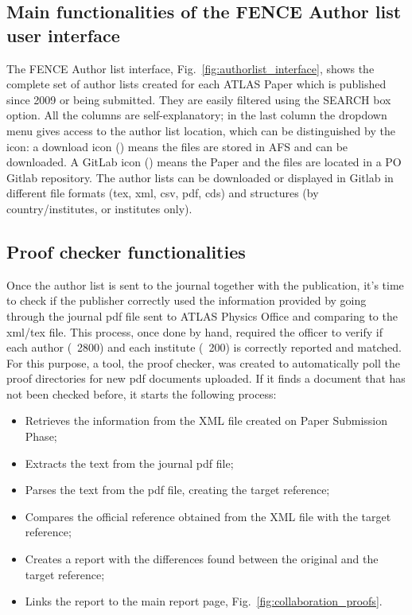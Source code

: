 \subsection{Main functionalities of the FENCE Author list user interface}
\label{sec:Main_functionalities_of_the_FENCE_Author_list_user_interface}

The FENCE Author list interface, Fig.~\ref{fig:authorlist_interface}, shows the complete set of author lists created for each ATLAS Paper which is published since 2009 or being submitted. They are easily filtered using the SEARCH box option. All the columns are self-explanatory; in the last column the dropdown menu gives access to the author list location, which can be distinguished by the icon: a download icon (\faDownload) means the files are stored in AFS and can be downloaded. A GitLab icon (\faGitlab) means the Paper and the files are located in a PO Gitlab repository. The author lists can be downloaded or displayed in Gitlab in different file formats (tex, xml, csv, pdf, cds) and structures (by country/institutes, or institutes only). 

\subsection{Proof checker functionalities}
\label{sec:Proof_checker_functionalities}
Once the author list is sent to the journal together with the publication, it’s time to check if the publisher correctly used the information provided by going through the journal pdf file sent to ATLAS Physics Office and comparing to the xml/tex file. This process, once done by hand, required the officer to verify if each author (~2800) and each institute (~200) is correctly reported and matched. 
For this purpose, a tool, the proof checker, was created to automatically poll the proof directories for new pdf documents uploaded. If it finds a document that has not been checked before, it starts the following process:

\begin{itemize}
\item Retrieves the information from the XML file created on Paper Submission Phase;
\item Extracts the text from the journal pdf file;
\item Parses the text from the pdf file, creating the target reference;
\item Compares the official reference obtained from the XML file with the target reference;
\item Creates a report with the differences found between the original and the target reference;
\item Links the report to the main report page, Fig.~\ref{fig:collaboration_proofs}.
\end{itemize}


